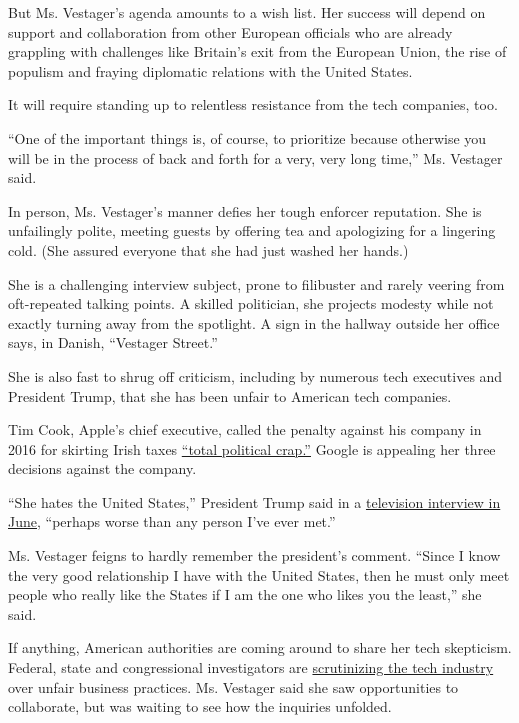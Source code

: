 But Ms. Vestager's agenda amounts to a wish list. Her success will
depend on support and collaboration from other European officials who
are already grappling with challenges like Britain's exit from the
European Union, the rise of populism and fraying diplomatic relations
with the United States.

It will require standing up to relentless resistance from the tech
companies, too.

``One of the important things is, of course, to prioritize because
otherwise you will be in the process of back and forth for a very, very
long time,'' Ms. Vestager said.

In person, Ms. Vestager's manner defies her tough enforcer reputation.
She is unfailingly polite, meeting guests by offering tea and
apologizing for a lingering cold. (She assured everyone that she had
just washed her hands.)

She is a challenging interview subject, prone to filibuster and rarely
veering from oft-repeated talking points. A skilled politician, she
projects modesty while not exactly turning away from the spotlight. A
sign in the hallway outside her office says, in Danish, ``Vestager
Street.''

She is also fast to shrug off criticism, including by numerous tech
executives and President Trump, that she has been unfair to American
tech companies.

Tim Cook, Apple's chief executive, called the penalty against his
company in 2016 for skirting Irish taxes
\href{https://www.independent.ie/business/irish/no-one-did-anything-wrong-here-and-ireland-is-being-picked-on-it-is-total-political-crap-apple-chief-tim-cook-35012145.html}{``total
political crap.''} Google is appealing her three decisions against the
company.

``She hates the United States,'' President Trump said in a
\href{https://www.nytimes.com/2019/06/26/business/economy/trump-china-tariffs-g20.html}{television
interview in June}, ``perhaps worse than any person I've ever met.''

Ms. Vestager feigns to hardly remember the president's comment. ``Since
I know the very good relationship I have with the United States, then he
must only meet people who really like the States if I am the one who
likes you the least,'' she said.

If anything, American authorities are coming around to share her tech
skepticism. Federal, state and congressional investigators are
\href{https://www.nytimes.com/2019/07/23/technology/justice-department-tech-antitrust.html}{scrutinizing
the tech industry} over unfair business practices. Ms. Vestager said she
saw opportunities to collaborate, but was waiting to see how the
inquiries unfolded.

